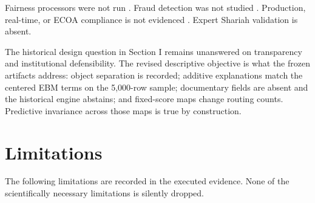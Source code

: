 \documentclass{ieeeaccess}
\begin{document}
Fairness processors were not run \cite{b8}. Fraud detection was not studied \cite{b19}. Production, real-time, or ECOA compliance is not evidenced \cite{b32,b33,b34}. Expert Shariah validation is absent.

The historical design question in Section I remains unanswered on transparency and institutional defensibility. The revised descriptive objective is what the frozen artifacts address: object separation is recorded; additive explanations match the centered EBM terms on the 5,000-row sample; documentary fields are absent and the historical engine abstains; and fixed-score maps change routing counts. Predictive invariance across those maps is true by construction.


\section{Limitations}

The following limitations are recorded in the executed evidence. None of the scientifically necessary limitations is silently dropped.
\end{document}

